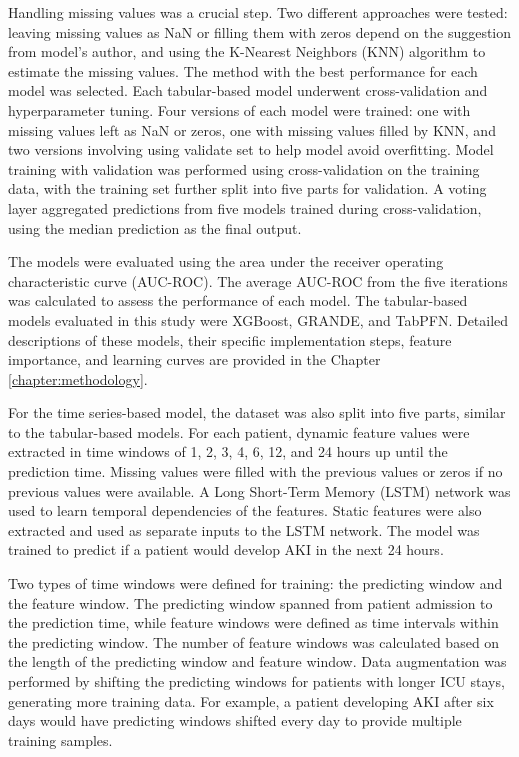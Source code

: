 \documentclass[../main.tex]{subfiles}
\begin{document}
Handling missing values was a crucial step.
Two different approaches were tested: leaving missing values as NaN or filling them with zeros depend on the suggestion from model's author, and using the K-Nearest Neighbors (KNN) algorithm to estimate the missing values.
The method with the best performance for each model was selected.
Each tabular-based model underwent cross-validation and hyperparameter tuning.
Four versions of each model were trained: one with missing values left as NaN or zeros, one with missing values filled by KNN, and two versions involving using validate set to help model avoid overfitting.
Model training with validation was performed using cross-validation on the training data, with the training set further split into five parts for validation.
A voting layer aggregated predictions from five models trained during cross-validation, using the median prediction as the final output.

The models were evaluated using the area under the receiver operating characteristic curve (AUC-ROC).
The average AUC-ROC from the five iterations was calculated to assess the performance of each model.
The tabular-based models evaluated in this study were XGBoost, GRANDE, and TabPFN.
Detailed descriptions of these models, their specific implementation steps, feature importance, and learning curves are provided in the Chapter \ref{chapter:methodology}.

For the time series-based model, the dataset was also split into five parts, similar to the tabular-based models.
For each patient, dynamic feature values were extracted in time windows of 1, 2, 3, 4, 6, 12, and 24 hours up until the prediction time.
Missing values were filled with the previous values or zeros if no previous values were available.
A Long Short-Term Memory (LSTM) network was used to learn temporal dependencies of the features.
Static features were also extracted and used as separate inputs to the LSTM network.
The model was trained to predict if a patient would develop AKI in the next 24 hours.

Two types of time windows were defined for training: the predicting window and the feature window.
The predicting window spanned from patient admission to the prediction time, while feature windows were defined as time intervals within the predicting window.
The number of feature windows was calculated based on the length of the predicting window and feature window.
Data augmentation was performed by shifting the predicting windows for patients with longer ICU stays, generating more training data.
For example, a patient developing AKI after six days would have predicting windows shifted every day to provide multiple training samples.
\end{document}
